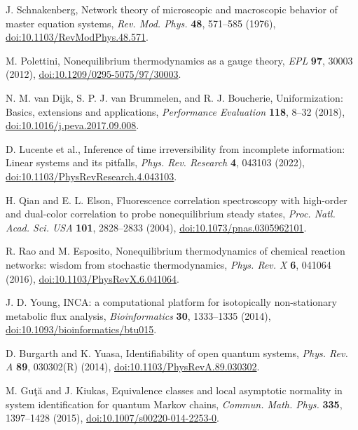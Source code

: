  J. Schnakenberg, Network theory of microscopic and macroscopic behavior of master equation systems, \emph{Rev. Mod. Phys.} \textbf{48}, 571--585 (1976), \href{https://doi.org/10.1103/RevModPhys.48.571}{doi:10.1103/RevModPhys.48.571}.

 M. Polettini, Nonequilibrium thermodynamics as a gauge theory, \emph{EPL} \textbf{97}, 30003 (2012), \href{https://doi.org/10.1209/0295-5075/97/30003}{doi:10.1209/0295-5075/97/30003}.

 N. M. van Dijk, S. P. J. van Brummelen, and R. J. Boucherie, Uniformization: Basics, extensions and applications, \emph{Performance Evaluation} \textbf{118}, 8--32 (2018), \href{https://doi.org/10.1016/j.peva.2017.09.008}{doi:10.1016/j.peva.2017.09.008}.

 D. Lucente et al., Inference of time irreversibility from incomplete information: Linear systems and its pitfalls, \emph{Phys. Rev. Research} \textbf{4}, 043103 (2022), \href{https://doi.org/10.1103/PhysRevResearch.4.043103}{doi:10.1103/PhysRevResearch.4.043103}.

 H. Qian and E. L. Elson, Fluorescence correlation spectroscopy with high-order and dual-color correlation to probe nonequilibrium steady states, \emph{Proc. Natl. Acad. Sci. USA} \textbf{101}, 2828--2833 (2004), \href{https://doi.org/10.1073/pnas.0305962101}{doi:10.1073/pnas.0305962101}.

 R. Rao and M. Esposito, Nonequilibrium thermodynamics of chemical reaction networks: wisdom from stochastic thermodynamics, \emph{Phys. Rev. X} \textbf{6}, 041064 (2016), \href{https://doi.org/10.1103/PhysRevX.6.041064}{doi:10.1103/PhysRevX.6.041064}.

 J. D. Young, INCA: a computational platform for isotopically non-stationary metabolic flux analysis, \emph{Bioinformatics} \textbf{30}, 1333--1335 (2014), \href{https://doi.org/10.1093/bioinformatics/btu015}{doi:10.1093/bioinformatics/btu015}.

 D. Burgarth and K. Yuasa, Identifiability of open quantum systems, \emph{Phys. Rev. A} \textbf{89}, 030302(R) (2014), \href{https://doi.org/10.1103/PhysRevA.89.030302}{doi:10.1103/PhysRevA.89.030302}.

 M. Gu\c{t}\u{a} and J. Kiukas, Equivalence classes and local asymptotic normality in system identification for quantum Markov chains, \emph{Commun. Math. Phys.} \textbf{335}, 1397--1428 (2015), \href{https://doi.org/10.1007/s00220-014-2253-0}{doi:10.1007/s00220-014-2253-0}.

